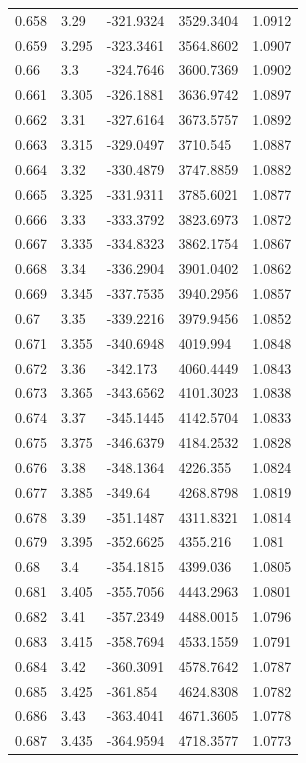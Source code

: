 \begin{tabular}{lllll}
0.658 & 3.29 & -321.9324 & 3529.3404 & 1.0912 \\
0.659 & 3.295 & -323.3461 & 3564.8602 & 1.0907 \\
0.66 & 3.3 & -324.7646 & 3600.7369 & 1.0902 \\
0.661 & 3.305 & -326.1881 & 3636.9742 & 1.0897 \\
0.662 & 3.31 & -327.6164 & 3673.5757 & 1.0892 \\
0.663 & 3.315 & -329.0497 & 3710.545 & 1.0887 \\
0.664 & 3.32 & -330.4879 & 3747.8859 & 1.0882 \\
0.665 & 3.325 & -331.9311 & 3785.6021 & 1.0877 \\
0.666 & 3.33 & -333.3792 & 3823.6973 & 1.0872 \\
0.667 & 3.335 & -334.8323 & 3862.1754 & 1.0867 \\
0.668 & 3.34 & -336.2904 & 3901.0402 & 1.0862 \\
0.669 & 3.345 & -337.7535 & 3940.2956 & 1.0857 \\
0.67 & 3.35 & -339.2216 & 3979.9456 & 1.0852 \\
0.671 & 3.355 & -340.6948 & 4019.994 & 1.0848 \\
0.672 & 3.36 & -342.173 & 4060.4449 & 1.0843 \\
0.673 & 3.365 & -343.6562 & 4101.3023 & 1.0838 \\
0.674 & 3.37 & -345.1445 & 4142.5704 & 1.0833 \\
0.675 & 3.375 & -346.6379 & 4184.2532 & 1.0828 \\
0.676 & 3.38 & -348.1364 & 4226.355 & 1.0824 \\
0.677 & 3.385 & -349.64 & 4268.8798 & 1.0819 \\
0.678 & 3.39 & -351.1487 & 4311.8321 & 1.0814 \\
0.679 & 3.395 & -352.6625 & 4355.216 & 1.081 \\
0.68 & 3.4 & -354.1815 & 4399.036 & 1.0805 \\
0.681 & 3.405 & -355.7056 & 4443.2963 & 1.0801 \\
0.682 & 3.41 & -357.2349 & 4488.0015 & 1.0796 \\
0.683 & 3.415 & -358.7694 & 4533.1559 & 1.0791 \\
0.684 & 3.42 & -360.3091 & 4578.7642 & 1.0787 \\
0.685 & 3.425 & -361.854 & 4624.8308 & 1.0782 \\
0.686 & 3.43 & -363.4041 & 4671.3605 & 1.0778 \\
0.687 & 3.435 & -364.9594 & 4718.3577 & 1.0773 \\

\end{tabular}
